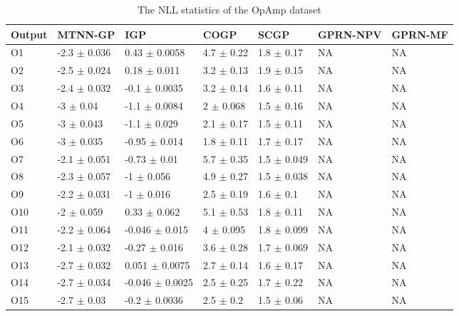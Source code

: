\begin{table}[!htb]
    \centering
    \caption{The NLL statistics of the OpAmp dataset}
    \label{tab:nll_DAC}
    \begin{tabular}{lllllll}
        \toprule
        Output & MTNN-GP              & IGP                     & COGP                & SCGP                & GPRN-NPV & GPRN-MF \\ \midrule
        O1     &  -2.3  $\pm$  0.036  &  0.43    $\pm$  0.0058  &  4.7  $\pm$  0.22   &  1.8  $\pm$  0.17   &  NA      & NA \\
        O2     &  -2.5  $\pm$  0.024  &  0.18    $\pm$  0.011   &  3.2  $\pm$  0.13   &  1.9  $\pm$  0.15   &  NA      & NA \\
        O3     &  -2.4  $\pm$  0.032  &  -0.1    $\pm$  0.0035  &  3.2  $\pm$  0.14   &  1.6  $\pm$  0.11   &  NA      & NA \\
        O4     &  -3    $\pm$  0.04   &  -1.1    $\pm$  0.0084  &  2    $\pm$  0.068  &  1.5  $\pm$  0.16   &  NA      & NA \\
        O5     &  -3    $\pm$  0.043  &  -1.1    $\pm$  0.029   &  2.1  $\pm$  0.17   &  1.5  $\pm$  0.11   &  NA      & NA \\
        O6     &  -3    $\pm$  0.035  &  -0.95   $\pm$  0.014   &  1.8  $\pm$  0.11   &  1.7  $\pm$  0.17   &  NA      & NA \\
        O7     &  -2.1  $\pm$  0.051  &  -0.73   $\pm$  0.01    &  5.7  $\pm$  0.35   &  1.5  $\pm$  0.049  &  NA      & NA \\
        O8     &  -2.3  $\pm$  0.057  &  -1      $\pm$  0.056   &  4.9  $\pm$  0.27   &  1.5  $\pm$  0.038  &  NA      & NA \\
        O9     &  -2.2  $\pm$  0.031  &  -1      $\pm$  0.016   &  2.5  $\pm$  0.19   &  1.6  $\pm$  0.1    &  NA      & NA \\
        O10    &  -2    $\pm$  0.059  &  0.33    $\pm$  0.062   &  5.1  $\pm$  0.53   &  1.8  $\pm$  0.11   &  NA      & NA \\
        O11    &  -2.2  $\pm$  0.064  &  -0.046  $\pm$  0.015   &  4    $\pm$  0.095  &  1.8  $\pm$  0.099  &  NA      & NA \\
        O12    &  -2.1  $\pm$  0.032  &  -0.27   $\pm$  0.016   &  3.6  $\pm$  0.28   &  1.7  $\pm$  0.069  &  NA      & NA \\
        O13    &  -2.7  $\pm$  0.032  &  0.051   $\pm$  0.0075  &  2.7  $\pm$  0.14   &  1.6  $\pm$  0.17   &  NA      & NA \\
        O14    &  -2.7  $\pm$  0.034  &  -0.046  $\pm$  0.0025  &  2.5  $\pm$  0.25   &  1.7  $\pm$  0.22   &  NA      & NA \\
        O15    &  -2.7  $\pm$  0.03   &  -0.2    $\pm$  0.0036  &  2.5  $\pm$  0.2    &  1.5  $\pm$  0.06   &  NA      & NA \\
        \bottomrule
    \end{tabular}
\end{table}
